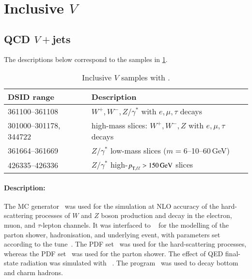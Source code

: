 \section[Inclusive Powheg \(V\)]{Inclusive \POWHEG \(V\)}

\subsection{QCD \(V+\)jets}

The descriptions below correspond to the samples in \cref{tab:v-powheg}.

\begin{table}[!htbp]
  \caption{Inclusive \(V\) samples with \POWHEG.}%
  \label{tab:v-powheg}
  \centering
  \begin{tabular}{l l}
    \toprule
    DSID range & Description \\
    \midrule
    361100--361108    & \(W^+,W^-,Z/\gamma^\ast\) with \(e,\mu,\tau\) decays\\
    301000--301178, 344722    & high-mass slices: \(W^+,W^-,Z\) with \(e,\mu,\tau\) decays \\
    361664--361669 & \(Z/\gamma^\ast\) low-mass slices (\(m=6\)--10--60\,\unit{\GeV})\\
    426335--426336 & \(Z/\gamma^\ast\) high-\(\pTX[][\ell\ell] > \qty{150}{\GeV}\) slices \\
    \bottomrule
  \end{tabular}
\end{table}

\paragraph{Description:}

The \POWHEGBOX[v1] MC generator~\cite{Nason:2004rx,Frixione:2007vw,Alioli:2010xd,Alioli:2008gx}
was used for the simulation at NLO accuracy of the hard-scattering processes of \(W\)
and \(Z\) boson production and decay in the electron, muon, and \(\tau\)-lepton
channels. It was interfaced to \PYTHIA[8.186]~\cite{Sjostrand:2007gs}
for the modelling of the parton shower, hadronisation, and underlying
event, with parameters set according to the \AZNLO
tune~\cite{STDM-2012-23}. The \CT[10nlo] PDF set~\cite{Lai:2010vv} was used
for the hard-scattering processes, whereas the \CTEQ[6L1] PDF
set~\cite{Pumplin:2002vw} was used for the parton shower. The effect of
QED final-state radiation was simulated with \PHOTOSpp[3.52]~\cite{Golonka:2005pn,Davidson:2010ew}.
The \EVTGEN[1.2.0] program~\cite{Lange:2001uf} was used to decay bottom and charm hadrons.

